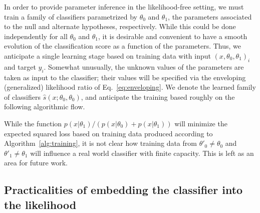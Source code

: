\documentclass[12pt]{article}
\numberwithin{equation}{section}
\theoremstyle{plain}
\begin{document}
In order to provide parameter inference in the likelihood-free setting, we must train a family of  classifiers parametrized by $\theta_0$ and $\theta_1$, the
parameters associated to the null and alternate hypotheses, respectively. While this could be done independently
for all $\theta_0$ and $\theta_1$, it is desirable and convenient to have a smooth evolution of the classification score as a function of the parameters. Thus, we anticipate a single learning stage based on training data with input $(x, \theta_0, \theta_1)_i$ and target $y_i$. Somewhat unusually, the unknown values of the parameters are taken
as input to the classifier; their values will be specified via the enveloping (generalized) likelihood ratio of Eq.~\ref{eq:enveloping}. We denote the learned family of classifiers $\hat{s}(x; \theta_0, \theta_0)$, and anticipate the training based roughly on the following algorithmic flow.

\bigskip

While the function $p(x|\theta_1)/(p(x|\theta_0)+p(x|\theta_1))$ will minimize the expected squared loss based on
training data produced according to Algorithm~\ref{alg:training}, it is not clear how training data from $\theta'_0 \ne \theta_0$ and $\theta'_1 \ne \theta_1$ will influence a real world classifier with finite capacity. This is left as an area for future work.

\subsection{Practicalities of embedding the classifier into the likelihood}
\end{document}
